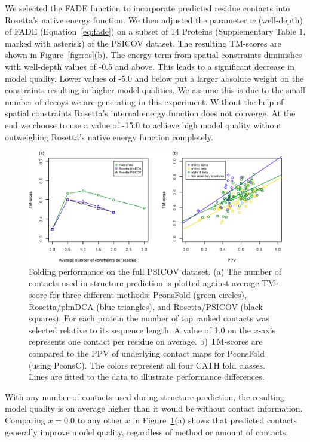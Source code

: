\documentclass{bioinfo}
\begin{document}
We selected the FADE function to incorporate predicted residue
contacts into Rosetta's native energy function. We then adjusted the
parameter $w$ (well-depth) of FADE (Equation~\ref{eq:fade}) on a
subset of 14 Proteins (Supplementary Table 1, marked with asterisk) of the PSICOV
dataset. The resulting TM-scores are shown in Figure~\ref{fig:ros}(b). The energy term from spatial constraints diminishes with
well-depth values of -0.5 and above. This leads to a significant
decrease in model quality. Lower values of -5.0 and below put a larger
absolute weight on the constraints resulting in higher model
qualities. We assume this is due to the small number of decoys we are
generating in this experiment. Without the help of spatial 
constraints Rosetta's internal energy function does not converge. 
At the end we choose to use a value of -15.0 to achieve
high model quality without outweighing Rosetta's native energy
function completely.


\begin{figure}[!tpb]%
\centerline{\includegraphics[scale=0.7]{figures/tmscores.eps}}
\caption{Folding performance on the full PSICOV dataset. (a) The 
 number of contacts used in structure prediction is
 plotted against average TM-score for three different methods:
 PconsFold (green circles), Rosetta/plmDCA (blue triangles), and
 Rosetta/PSICOV (black squares). For each protein the number of top
 ranked contacts was selected relative to its sequence length. A value
 of 1.0 on the $x$-axis represents one
 contact per residue on average. b) TM-scores are compared
 to the PPV of underlying contact maps for PconsFold (using
 PconsC). The colors represent all four CATH fold classes. Lines 
 are fitted to the data to illustrate performance differences.}\label{fig:main}
\end{figure}

With any number of contacts used during structure prediction, the
resulting model quality is on average higher than it would be without
contact information. Comparing $x=0.0$ to any
other $x$ in Figure~\ref{fig:main}(a) shows that predicted contacts generally improve model
quality, regardless of method or amount of contacts. 
\end{document}
